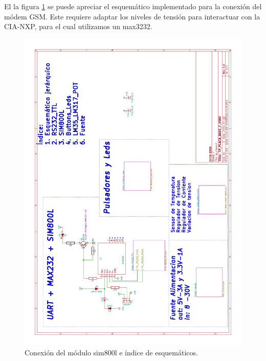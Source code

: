 El la figura \ref{fig:essim800} se puede apreciar el esquemático implementado para la conexión del módem GSM. Este requiere adaptar los niveles de tensión para interactuar con la CIA-NXP, para el cual utilizamos un max3232.
\begin{figure}[h]
      \centering
      \includegraphics[page=1,scale=0.3,angle=270]{./Figures/schematic.pdf}
      \caption{Conexión del módulo sim800l e índice de esquemáticos.}
      \label{fig:essim800}
\end{figure}

